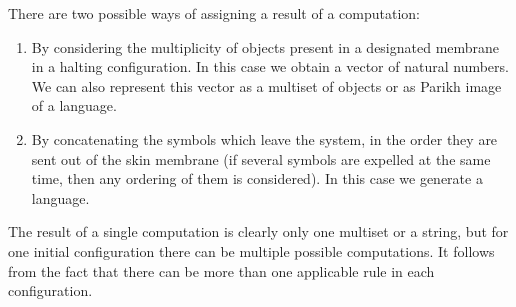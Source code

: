 
There are two possible ways of assigning a result of a computation:

\begin{enumerate}
    \item By considering the multiplicity of objects present in a designated membrane in a halting configuration. In this case we obtain a vector of natural numbers. We can also represent this vector as a multiset of objects or as Parikh image of a language.
    \item By concatenating the symbols which leave the system, in the order they are sent out of the skin membrane (if several symbols are expelled at the same time, then any ordering of them is considered). In this case we generate a language.
\end{enumerate}

The result of a single computation is clearly only one multiset or a string, but for one initial configuration there can be multiple possible computations. It follows from the fact that there can be more than one applicable rule in each configuration.